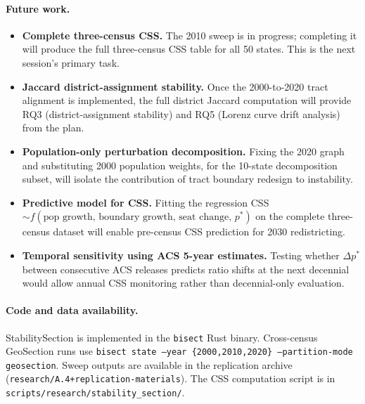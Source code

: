 \paragraph{Future work.}
\begin{itemize}
\item \textbf{Complete three-census CSS.}
  The 2010 sweep is in progress; completing it will produce the full
  three-census CSS table for all 50 states.
  This is the next session's primary task.

\item \textbf{Jaccard district-assignment stability.}
  Once the 2000-to-2020 tract alignment is implemented, the full district
  Jaccard computation will provide RQ3 (district-assignment stability)
  and RQ5 (Lorenz curve drift analysis) from the plan.

\item \textbf{Population-only perturbation decomposition.}
  Fixing the 2020 graph and substituting 2000 population weights, for the
  10-state decomposition subset, will isolate the contribution of tract
  boundary redesign to instability.

\item \textbf{Predictive model for CSS.}
  Fitting the regression CSS $\sim f(\text{pop growth, boundary growth,
  seat change, } p^*)$ on the complete three-census dataset will enable
  pre-census CSS prediction for 2030 redistricting.

\item \textbf{Temporal sensitivity using ACS 5-year estimates.}
  Testing whether $\Delta p^*$ between consecutive ACS releases predicts
  ratio shifts at the next decennial would allow annual CSS monitoring
  rather than decennial-only evaluation.
\end{itemize}

\paragraph{Code and data availability.}
StabilitySection is implemented in the \texttt{bisect} Rust binary.
Cross-census GeoSection runs use \texttt{bisect state --year \{2000,2010,2020\}
--partition-mode geosection}.
Sweep outputs are available in the replication archive
(\texttt{research/A.4+replication-materials}).
The CSS computation script is in \texttt{scripts/research/stability\_section/}.
